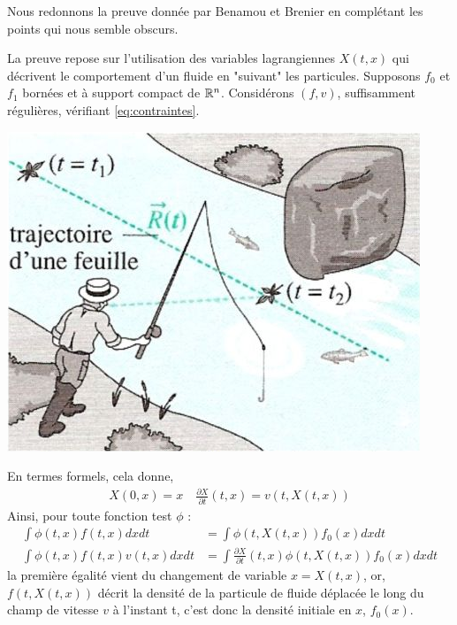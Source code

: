 \documentclass[a4paper,12pt]{article}
\begin{document}
\begin{preuve}
Nous redonnons la preuve donnée par Benamou et Brenier en complétant les points qui nous semble obscurs.\\


\begin{minipage}{0.5\linewidth}
La preuve repose sur l'utilisation des variables lagrangiennes $X(t,x)$ qui décrivent le comportement d'un fluide en "suivant" les particules. 
Supposons $f_0$ et $f_1$ bornées et à support compact de $\mathbb{R}^n$. Considérons $(f,v)$, suffisamment régulières, vérifiant \eqref{eq:contraintes}.
\end{minipage}\hfill
\begin{minipage}{0.55\linewidth}
\begin{center}
\includegraphics[scale=0.3]{img/lagrange.png}
\end{center}
\end{minipage}


En termes formels, cela donne, 
\begin{align}
X(0,x)=x\quad\frac{\partial X}{\partial t}(t,x) = v(t,X(t,x))
\label{eq:defcoordlag}
\end{align}
Ainsi, pour toute fonction test $\phi$ :
\begin{align}
\int \phi(t,x)f(t,x) dxdt &=\int \phi(t,X(t,x))f_0(x)dxdt \label{eq:coordlagrangienn}\\ 
\int \phi(t,x)f(t,x)v(t,x) dxdt &= \int \frac{\partial X}{\partial t}(t,x)\phi(t,X(t,x))f_0(x)dxdt 
\end{align}
la première égalité vient du changement de variable $x=X(t,x)$, or, $f(t,X(t,x))$ décrit la densité de la particule de fluide déplacée le long du champ de vitesse $v$ à l'instant t, c'est donc la densité initiale en $x$, $f_0(x)$. \\


\end{preuve}
\end{document}
